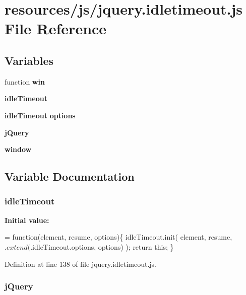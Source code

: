 \section{resources/js/jquery.idletimeout.\+js File Reference}
\label{resources_2js_2jquery_8idletimeout_8js}
\subsection*{Variables}
\begin{DoxyCompactItemize}
\item 
function {\bf win}
\item 
{\bf idle\+Timeout}
\item 
{\bf idle\+Timeout} {\bf options}
\item 
{\bf j\+Query}
\item 
{\bf window}
\end{DoxyCompactItemize}


\subsection{Variable Documentation}
\subsubsection[{idle\+Timeout}]{\setlength{\rightskip}{0pt plus 5cm}idle\+Timeout}\label{resources_2js_2jquery_8idletimeout_8js_adc886feb5b7a76ead000444979cc23a5}
{\bfseries Initial value\+:}
\begin{DoxyCode}
= \textcolor{keyword}{function}(element, resume, options)\{
        idleTimeout.init( element, resume, $.extend($.idleTimeout.options, 
      options) );
        \textcolor{keywordflow}{return} \textcolor{keyword}{this};
    \}
\end{DoxyCode}


Definition at line 138 of file jquery.\+idletimeout.\+js.

\subsubsection[{j\+Query}]{\setlength{\rightskip}{0pt plus 5cm}j\+Query}\label{resources_2js_2jquery_8idletimeout_8js_a2b1d6f9c448e3ce72f4e1865d6e38d2c}


